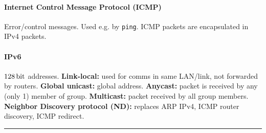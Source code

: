 \documentclass{form}
\begin{document}
\begin{multicols}{3}
    \paragraph{Internet Control Message Protocol (ICMP)}
    Error/control messages. Used e.g. by \texttt{ping}. ICMP packets are encapsulated in IPv4 packets.

    \paragraph{IPv6}
    $\SI{128}{\bit}$ addresses.
    \textbf{Link-local:} used for comms in same LAN/link, not forwarded by routers.
    \textbf{Global unicast:} global address.
    \textbf{Anycast:} packet is received by any (only 1) member of group.
    \textbf{Multicast:} packet received by all group members.
    \textbf{Neighbor Discovery protocol (ND):} replaces ARP IPv4, ICMP router discovery, ICMP redirect.
\end{multicols}

\vspace{-1.5em}\rule{\textwidth}{1.0pt}\vspace{-0.0em}
\end{document}
